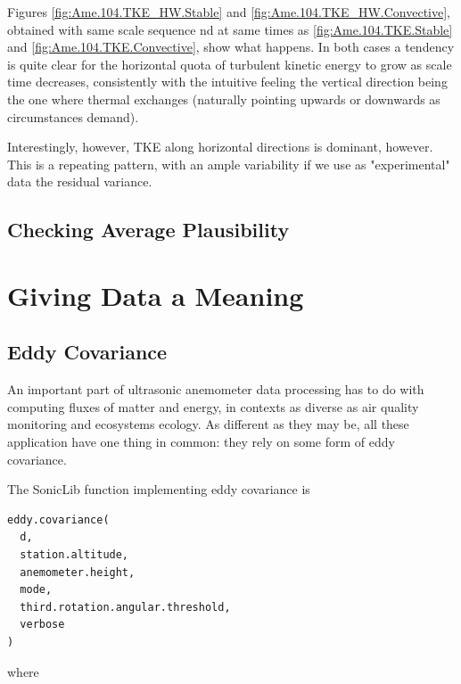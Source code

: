 \documentclass[a4paper,10pt]{book}
\begin{document}
Figures \ref{fig:Ame.104.TKE_HW.Stable} and \ref{fig:Ame.104.TKE_HW.Convective}, obtained with same scale sequence nd at same times as \ref{fig:Ame.104.TKE.Stable} and \ref{fig:Ame.104.TKE.Convective}, show what happens. In both cases a tendency is quite clear for the horizontal quota of turbulent kinetic energy to grow as scale time decreases, consistently with the intuitive feeling the vertical direction being the one where thermal exchanges (naturally pointing upwards or downwards as circumstances demand).

Interestingly, however, TKE along horizontal directions is dominant, however. This is a repeating pattern, with an ample variability if we use as "experimental" data the residual variance.



\section{Checking Average Plausibility}
\label{sec:Plausibility_Check_Average}


\chapter{Giving Data a Meaning}
\label{chap:Data Interpretation}

\section{Eddy Covariance}
\label{sec:Eddy Covariance}

An important part of ultrasonic anemometer data processing has to do with computing fluxes of matter and energy, in contexts as diverse as air quality monitoring and ecosystems ecology. As different as they may be, all these application have one thing in common: they rely on some form of eddy covariance.

The SonicLib function implementing eddy covariance is

\begin{verbatim}
eddy.covariance(
  d,
  station.altitude,
  anemometer.height,
  mode,
  third.rotation.angular.threshold,
  verbose
)
\end{verbatim} 

\noindent where
\end{document}
